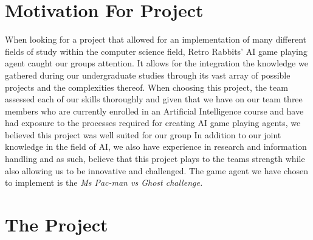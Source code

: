 \documentclass[11pt]{article}
\begin{document}
\section{Motivation For Project}
When looking for a project that allowed for an implementation of many different fields of study within the computer science field, Retro Rabbits' AI game playing agent caught our groups attention. It allows for the integration the knowledge we gathered during our undergraduate studies through its vast array of possible projects and the complexities thereof. 
\newline When choosing this project, the team assessed each of our skills thoroughly and given that we have on our team three members who are currently enrolled in an Artificial Intelligence course and have had exposure to the processes required for creating AI game playing agents, we believed this project was well suited for our group
\newline In addition to our joint knowledge in the field of AI, we  also have experience in research and information handling and as such, believe that this project plays to the teams strength while also allowing us to be innovative and challenged.
\newline
\newline The game agent we have chosen to implement is the \emph{Ms Pac-man vs Ghost challenge.} 

\section{The Project}
\end{document}
